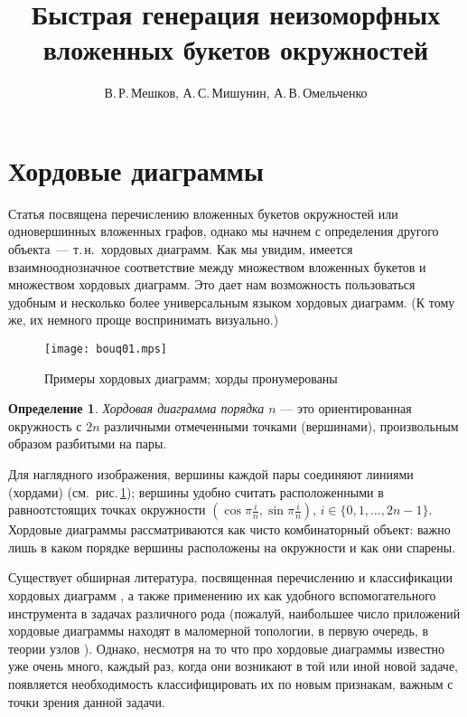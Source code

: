\documentclass[a4paper,12pt]{article}
\def\figureref#1{рис.\,\protect\ref{#1}}
\theoremstyle{plain}
\theoremstyle{definition}
\newtheorem{definition}{Определение}
\begin{document}
\title{Быстрая генерация неизоморфных вложенных букетов окружностей}
\author{В.\,Р.\,Мешков, А.\,С.\,Мишунин, А.\,В.\,Омельченко}
\maketitle

\section{Хордовые диаграммы}

Статья посвящена перечислению вложенных букетов окружностей или одновершинных вложенных графов, однако мы начнем с определения
другого объекта~--- т.\,н.~хордовых диаграмм. Как мы увидим, имеется взаимнооднозначное соответствие между множеством вложенных
букетов и множеством хордовых диаграмм. Это дает нам возможность пользоваться удобным и несколько более универсальным языком
хордовых диаграмм. (К тому же, их немного проще воспринимать визуально.)
\begin{figure}[ht]
\centering
\texttt{[image: bouq01.mps]}
\caption{\footnotesize Примеры хордовых диаграмм; хорды пронумерованы\label{figure:chord-samples}}
\end{figure}
\begin{definition}
\textit{Хордовая диаграмма порядка $n$} --- это ориентированная окружность с $2n$ различными отмеченными точками (вершинами),
произвольным образом разбитыми на пары.
\end{definition}
Для наглядного изображения, вершины каждой пары соединяют линиями (хордами) (см.~\figureref{figure:chord-samples}); вершины
удобно считать расположенными в равноотстоящих точках окружности $(\cos\pi\frac{i}{n},\sin\pi\frac{i}{n})$,
$i\in\{0,1,\dots,2n{-}1\}$. Хордовые диаграммы рассматриваются как чисто комбинаторный объект: важно лишь в каком порядке
вершины расположены на окружности и как они спарены.

Существует обширная литература, посвященная перечислению и классификации хордовых диаграмм
\cite{CoryMarcus1998,Flajolet2000,Stoimenow2000,Sawada2002}, а также применению их как удобного вспомогательного инструмента в
задачах различного рода (пожалуй, наибольшее число приложений хордовые диаграммы находят в маломерной топологии, в первую
очередь, в теории узлов \cite{Zvonkin2010,Duzhin2010}). Однако, несмотря на то что про хордовые диаграммы известно уже очень
много, каждый раз, когда они возникают в той или иной новой задаче, появляется необходимость классифицировать их по новым
признакам, важным с точки зрения данной задачи.
\end{document}

